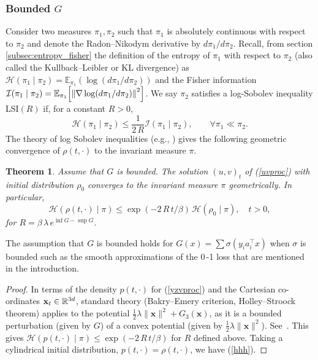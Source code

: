 \documentclass[11pt, twoside]{report}
\newtheorem{theorem}{Theorem}[section]
\renewcommand{\vec}[1]{{\mathbf{#1}}}
\begin{document}
\subsubsection{Bounded \texorpdfstring{$G$}{G}}
Consider two measures $\pi_1,\pi_2$ such that $\pi_1$ is absolutely continuous with respect to $\pi_2$ and denote the Radon--Nikodym derivative by $d\pi_1/d\pi_2$. Recall, from section \ref{subsec:entropy_fisher} the definition of the entropy of $\pi_1$ with respect to $\pi_2$ (also called the Kullback--Leibler or KL divergence) as $\mathcal H(\pi_1\mid \pi_2)=\mathbb{E}_{\pi_1}(\log(d\pi_1/d\pi_2))$ and the Fisher information $\mathcal I(\pi_1\mid \pi_2)=\mathbb{E}_{\pi_1}\bp{\norm{\nabla \log(d\pi_1/d\pi_2)}^2}$. We say $\pi_2$ satisfies a log-Sobolev inequality LSI$(R)$ if, for a constant $R>0$,
\[\mathcal{H}(\pi_1\mid \pi_2)\le\frac{1}{2\,R} \mathcal{I}(\pi_1\mid \pi_2),\qquad \forall \pi_1\ll \pi_2. 
\]
The theory of log Sobolev inequalities (e.g., \cite{Lelievre2016-hx}) gives the following geometric convergence of $\rho(t,\cdot)$ to the invariant measure $\pi$. 
\begin{theorem} \label{thm_bndd_G} Assume that $G$ is bounded.
    The solution $(u,v)_t$ of (\ref{uvproc}) with initial distribution $\rho_0$ converges to the invariant measure $\pi$ geometrically. In particular, 
    \begin{equation}\mathcal H(\rho(t,\cdot) \mid \pi)\le \exp(-2\,R\,t/\beta)\, \mathcal H(\rho_0 \mid \pi),\quad t>0,
    \label{hhh}\end{equation}
    for $R=\beta\, \lambda\,e^{\inf G-\sup G}$.
\end{theorem}
The assumption that $G$ is bounded holds for  $G(x)=\sum \sigma(y_i a_i^\top x)$ when $\sigma$ is bounded such as the smooth approximations of the 0\,-1 loss that are mentioned in the introduction.
\begin{proof}
 In terms of the density $p(t,\cdot)$ for (\ref{yzvproc}) and the Cartesian co-ordinates $\vec x_t\in \real^{3d}$, standard theory (Bakry--Emery criterion, Holley--Stroock theorem) applies to the potential $\frac 12 \lambda \|\vec x \|^2+G_3(\vec x)$, as it is a bounded perturbation (given by $G$) of a convex potential (given by $\frac12\lambda\|\vec x\|^2$).
 See~\cite[Proposition 2.9]{Lelievre2016-hx}. This gives $\mathcal H(p(t,\cdot) \mid \pi)\le \exp(-2\,R\,t/\beta)$ for $R$ defined above. Taking a cylindrical initial distribution, $p(t,\cdot)=\rho(t,\cdot)$, we have (\ref{hhh}).
\end{proof}
\end{document}
